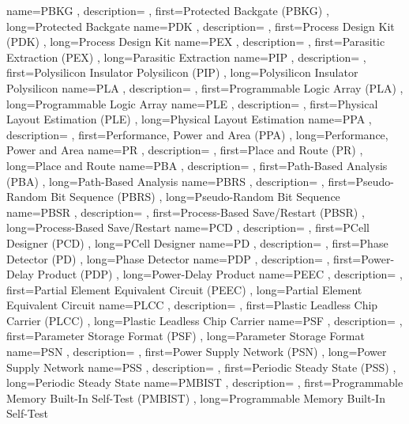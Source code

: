 { name={PBKG}
, description={}
, first={Protected Backgate (PBKG)}
, long={Protected Backgate}
}
{ name={PDK}
, description={}
, first={Process Design Kit (PDK)}
, long={Process Design Kit}
}
{ name={PEX}
, description={}
, first={Parasitic Extraction (PEX)}
, long={Parasitic Extraction}
}
{ name={PIP}
, description={}
, first={Polysilicon Insulator Polysilicon (PIP)}
, long={Polysilicon Insulator Polysilicon}
}
{ name={PLA}
, description={}
, first={Programmable Logic Array (PLA)}
, long={Programmable Logic Array}
}
{ name={PLE}
, description={}
, first={Physical Layout Estimation (PLE)}
, long={Physical Layout Estimation}
}
{ name={PPA}
, description={}
, first={Performance, Power and Area (PPA)}
, long={Performance, Power and Area}
}
{ name={PR}
, description={}
, first={Place and Route (PR)}
, long={Place and Route}
}
{ name={PBA}
, description={}
, first={Path-Based Analysis (PBA)}
, long={Path-Based Analysis}
}
{ name={PBRS}
, description={}
, first={Pseudo-Random Bit Sequence (PBRS)}
, long={Pseudo-Random Bit Sequence}
}
{ name={PBSR}
, description={}
, first={Process-Based Save/Restart (PBSR)}
, long={Process-Based Save/Restart}
}
{ name={PCD}
, description={}
, first={PCell Designer (PCD)}
, long={PCell Designer}
}
{ name={PD}
, description={}
, first={Phase Detector (PD)}
, long={Phase Detector}
}
{ name={PDP}
, description={}
, first={Power-Delay Product (PDP)}
, long={Power-Delay Product}
}
{ name={PEEC}
, description={}
, first={Partial Element Equivalent Circuit (PEEC)}
, long={Partial Element Equivalent Circuit}
}
{ name={PLCC}
, description={}
, first={Plastic Leadless Chip Carrier (PLCC)}
, long={Plastic Leadless Chip Carrier}
}
{ name={PSF}
, description={}
, first={Parameter Storage Format (PSF)}
, long={Parameter Storage Format}
}
{ name={PSN}
, description={}
, first={Power Supply Network (PSN)}
, long={Power Supply Network}
}
{ name={PSS}
, description={}
, first={Periodic Steady State (PSS)}
, long={Periodic Steady State}
}
{ name={PMBIST}
, description={}
, first={Programmable Memory Built-In Self-Test (PMBIST)}
, long={Programmable Memory Built-In Self-Test}
}
